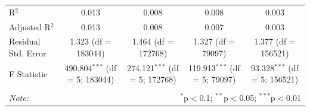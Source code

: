 \documentclass[
]{article}
\begin{document}
\begin{table}[!htbp]
\begin{tabular}{@{\extracolsep{5pt}}lcccc}
R$^{2}$ & 0.013 & 0.008 & 0.008 & 0.003 \\ 
Adjusted R$^{2}$ & 0.013 & 0.008 & 0.007 & 0.003 \\ 
Residual Std. Error & 1.323 (df = 183044) & 1.464 (df = 172768) & 1.327 (df = 79097) & 1.377 (df = 156521) \\ 
F Statistic & 490.804$^{***}$ (df = 5; 183044) & 274.121$^{***}$ (df = 5; 172768) & 119.913$^{***}$ (df = 5; 79097) & 93.328$^{***}$ (df = 5; 156521) \\ 
\hline 
\hline \\[-1.8ex] 
\textit{Note:}  & \multicolumn{4}{r}{$^{*}$p$<$0.1; $^{**}$p$<$0.05; $^{***}$p$<$0.01} \\ 
\end{tabular} 
\end{table}
\end{document}
